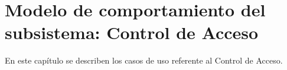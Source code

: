 \documentclass[10pt]{book}
\begin{document}
	\chapter{Modelo de comportamiento del subsistema: Control de Acceso}
	\label{chp:controlAcceso}
	
	En este capítulo se describen los casos de uso referente al Control de Acceso.\bigskip
	
%	
%	
\end{document}
